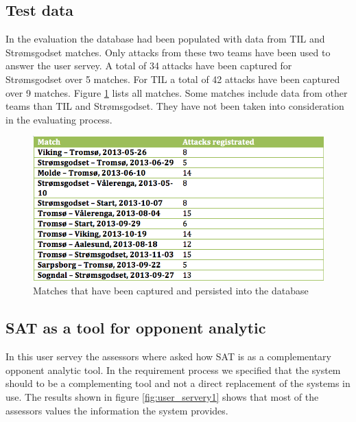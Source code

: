 \subsection{Test data}

In the evaluation the database had been populated with data from \ac{TIL} and Str{\o}msgodset matches. Only attacks from these two teams have been used to answer the user servey. A total of 34 attacks have been captured for Str{\o}msgodset over 5 matches. For \ac{TIL} a total of 42 attacks have been captured over 9 matches. Figure \ref{fig:matches_regged} lists all matches. Some matches include data from other teams than \ac{TIL} and Str{\o}msgodset. They have not been taken into consideration in the evaluating process.

\begin{figure}[ht!]
\centering
\includegraphics[width=1\textwidth]{images/evaluation/matched_regged.png}
\caption{Matches that have been captured and persisted into the database}
\label{fig:matches_regged}
\end{figure}

\subsection{SAT as a tool for opponent analytic}

In this user servey the assessors where asked how SAT is as a complementary opponent analytic tool. In the requirement process we specified that the system should to be a complementing tool and not a direct replacement of the systems in use. The results shown in figure \ref{fig:user_servery1} shows that most of the assessors values the information the system provides. 

